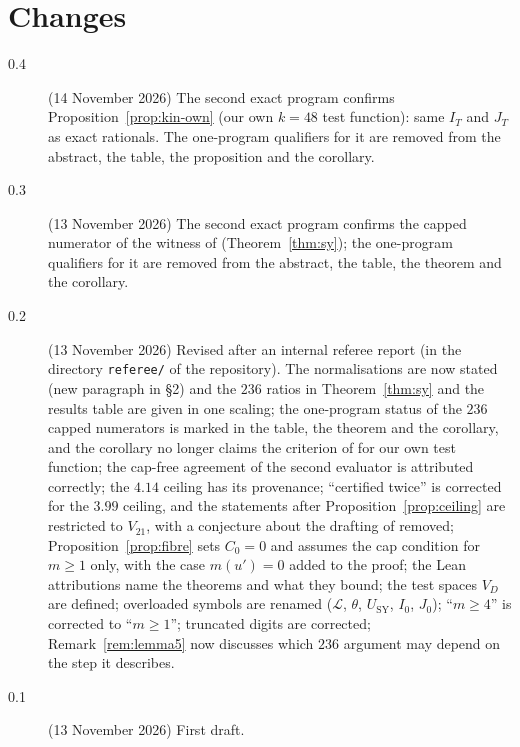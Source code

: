 \section*{Changes}
\begin{description}
\item[0.4] (14 November 2026) The second exact program confirms
Proposition~\ref{prop:kin-own} (our own $k=48$ test function): same $I_T$ and
$J_T$ as exact rationals. The one-program qualifiers for it are removed from
the abstract, the table, the proposition and the corollary.
\item[0.3] (13 November 2026) The second exact program confirms the capped
numerator of the witness of \cite{SY26} (Theorem~\ref{thm:sy}); the
one-program qualifiers for it are removed from the abstract, the table, the
theorem and the corollary.
\item[0.2] (13 November 2026) Revised after an internal referee report
(in the directory \texttt{referee/} of the repository).
The normalisations are now stated (new paragraph in \S2) and the $236$ ratios
in Theorem~\ref{thm:sy} and the results table are given in one scaling;
the one-program status of the $236$ capped numerators is marked in the table,
the theorem and the corollary, and the corollary no longer claims the
criterion of \cite{SY26} for our own test function; the cap-free agreement of
the second evaluator is attributed correctly; the $4.14$ ceiling has its
provenance; ``certified twice'' is corrected for the $3.99$ ceiling, and the
statements after Proposition~\ref{prop:ceiling} are restricted to $V_{21}$,
with a conjecture about the drafting of \cite{Cha26} removed;
Proposition~\ref{prop:fibre} sets $C_0=0$ and assumes the cap condition for
$m\ge1$ only, with the case $m(u')=0$ added to the proof; the Lean
attributions name the theorems and what they bound; the test spaces $V_D$ are
defined; overloaded symbols are renamed ($\mathcal L$, $\theta$,
$U_{\mathrm{SY}}$, $I_0$, $J_0$); ``$m\ge4$'' is corrected to ``$m\ge1$'';
truncated digits are corrected; Remark~\ref{rem:lemma5} now discusses which
$236$ argument may depend on the step it describes.
\item[0.1] (13 November 2026) First draft.
\end{description}


